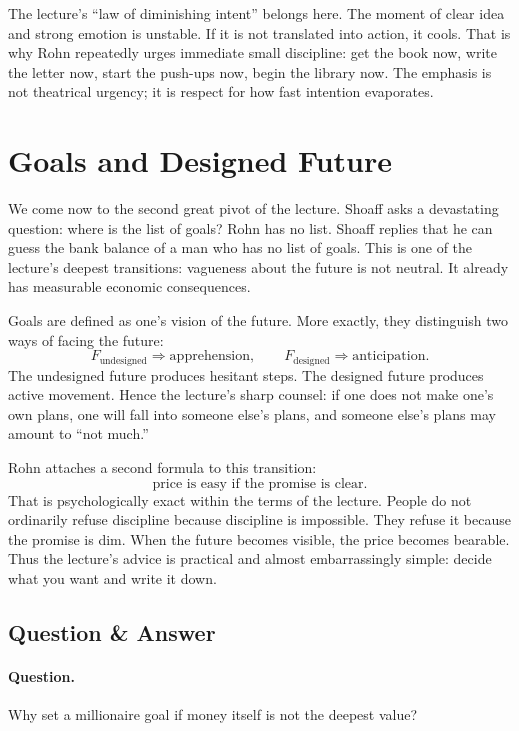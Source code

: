The lecture's ``law of diminishing intent'' belongs here. The moment of clear idea and strong emotion is unstable. If it is not translated into action, it cools. That is why Rohn repeatedly urges immediate small discipline: get the book now, write the letter now, start the push-ups now, begin the library now. The emphasis is not theatrical urgency; it is respect for how fast intention evaporates.

\section{Goals and Designed Future}

We come now to the second great pivot of the lecture. Shoaff asks a devastating question: where is the list of goals? Rohn has no list. Shoaff replies that he can guess the bank balance of a man who has no list of goals. This is one of the lecture's deepest transitions: vagueness about the future is not neutral. It already has measurable economic consequences.

Goals are defined as one's vision of the future. More exactly, they distinguish two ways of facing the future:
\begin{equation}
F_{\text{undesigned}} \Rightarrow \mathrm{apprehension},
\qquad
F_{\text{designed}} \Rightarrow \mathrm{anticipation}.
\end{equation}
The undesigned future produces hesitant steps. The designed future produces active movement. Hence the lecture's sharp counsel: if one does not make one's own plans, one will fall into someone else's plans, and someone else's plans may amount to ``not much.''

Rohn attaches a second formula to this transition:
\begin{equation}
\text{price is easy if the promise is clear}.
\end{equation}
That is psychologically exact within the terms of the lecture. People do not ordinarily refuse discipline because discipline is impossible. They refuse it because the promise is dim. When the future becomes visible, the price becomes bearable. Thus the lecture's advice is practical and almost embarrassingly simple: decide what you want and write it down.

\subsection{Question \& Answer}

\paragraph{Question.} Why set a millionaire goal if money itself is not the deepest value?

